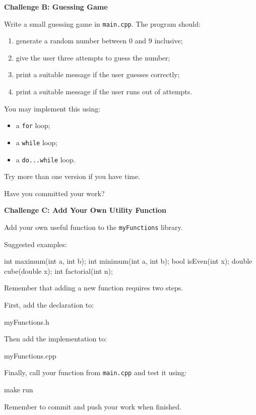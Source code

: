 \documentclass{csc2059practical}
\begin{document}
\begin{challengebox}
\textbf{Challenge B: Guessing Game}

Write a small guessing game in \texttt{main.cpp}. The program should:

\begin{enumerate}
  \item generate a random number between 0 and 9 inclusive;
  \item give the user three attempts to guess the number;
  \item print a suitable message if the user guesses correctly;
  \item print a suitable message if the user runs out of attempts.
\end{enumerate}

You may implement this using:

\begin{itemize}
  \item a \texttt{for} loop;
  \item a \texttt{while} loop;
  \item a \texttt{do...while} loop.
\end{itemize}

Try more than one version if you have time.

Have you committed your work?
\end{challengebox}

\begin{challengebox}
\textbf{Challenge C: Add Your Own Utility Function}

Add your own useful function to the \texttt{myFunctions} library.

Suggested examples:

\begin{cppcode}
int maximum(int a, int b);
int minimum(int a, int b);
bool isEven(int x);
double cube(double x);
int factorial(int n);
\end{cppcode}

Remember that adding a new function requires two steps.

First, add the declaration to:

\begin{terminal}
myFunctions.h
\end{terminal}

Then add the implementation to:

\begin{terminal}
myFunctions.cpp
\end{terminal}

Finally, call your function from \texttt{main.cpp} and test it using:

\begin{bashcode}
make run
\end{bashcode}

Remember to commit and push your work when finished.
\end{challengebox}
\end{document}
